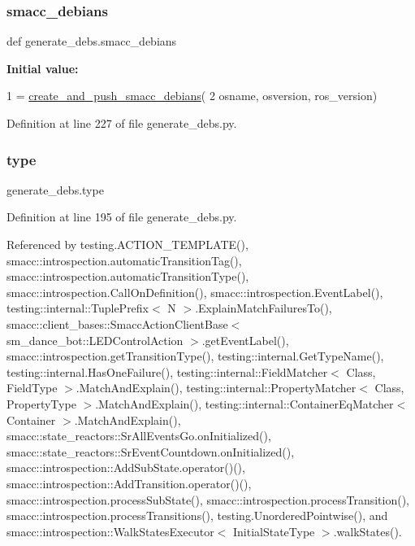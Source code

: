 \subsubsection{\texorpdfstring{smacc\+\_\+debians}{smacc\_debians}}
{\footnotesize\ttfamily def generate\+\_\+debs.\+smacc\+\_\+debians}

{\bfseries Initial value\+:}
\begin{DoxyCode}
1 =  \hyperlink{namespacegenerate__debs_af7237c463c8e5b4df369e6befc154c50}{create\_and\_push\_smacc\_debians}(
2         osname, osversion, ros\_version)
\end{DoxyCode}


Definition at line 227 of file generate\+\_\+debs.\+py.

\mbox{\label{namespacegenerate__debs_a50bc9a7ecac9584553e089a448bcde58}} 
\subsubsection{\texorpdfstring{type}{type}}
{\footnotesize\ttfamily generate\+\_\+debs.\+type}



Definition at line 195 of file generate\+\_\+debs.\+py.



Referenced by testing.\+A\+C\+T\+I\+O\+N\+\_\+\+T\+E\+M\+P\+L\+A\+T\+E(), smacc\+::introspection.\+automatic\+Transition\+Tag(), smacc\+::introspection.\+automatic\+Transition\+Type(), smacc\+::introspection.\+Call\+On\+Definition(), smacc\+::introspection.\+Event\+Label(), testing\+::internal\+::\+Tuple\+Prefix$<$ N $>$.\+Explain\+Match\+Failures\+To(), smacc\+::client\+\_\+bases\+::\+Smacc\+Action\+Client\+Base$<$ sm\+\_\+dance\+\_\+bot\+::\+L\+E\+D\+Control\+Action $>$.\+get\+Event\+Label(), smacc\+::introspection.\+get\+Transition\+Type(), testing\+::internal.\+Get\+Type\+Name(), testing\+::internal.\+Has\+One\+Failure(), testing\+::internal\+::\+Field\+Matcher$<$ Class, Field\+Type $>$.\+Match\+And\+Explain(), testing\+::internal\+::\+Property\+Matcher$<$ Class, Property\+Type $>$.\+Match\+And\+Explain(), testing\+::internal\+::\+Container\+Eq\+Matcher$<$ Container $>$.\+Match\+And\+Explain(), smacc\+::state\+\_\+reactors\+::\+Sr\+All\+Events\+Go.\+on\+Initialized(), smacc\+::state\+\_\+reactors\+::\+Sr\+Event\+Countdown.\+on\+Initialized(), smacc\+::introspection\+::\+Add\+Sub\+State.\+operator()(), smacc\+::introspection\+::\+Add\+Transition.\+operator()(), smacc\+::introspection.\+process\+Sub\+State(), smacc\+::introspection.\+process\+Transition(), smacc\+::introspection.\+process\+Transitions(), testing.\+Unordered\+Pointwise(), and smacc\+::introspection\+::\+Walk\+States\+Executor$<$ Initial\+State\+Type $>$.\+walk\+States().

